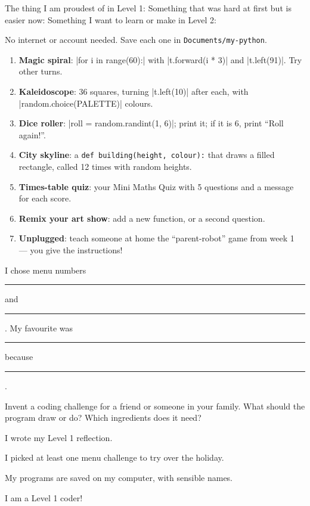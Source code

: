 \namedateline

\begin{core}
The thing I am proudest of in Level 1:
Something that was hard at first but is easier now:
Something I want to learn or make in Level 2:
\end{core}

\begin{challenge}
No internet or account needed. Save each one in \texttt{Documents/my-python}.
\begin{enumerate}[leftmargin=1.6em,itemsep=2pt]
  \item \textbf{Magic spiral}: \py|for i in range(60):| with \py|t.forward(i * 3)| and \py|t.left(91)|. Try other turns.
  \item \textbf{Kaleidoscope}: 36 squares, turning \py|t.left(10)| after each, with \py|random.choice(PALETTE)| colours.
  \item \textbf{Dice roller}: \py|roll = random.randint(1, 6)|; print it; if it is 6, print \enquote{Roll again!}.
  \item \textbf{City skyline}: a \texttt{def building(height, colour):} that draws a filled rectangle, called 12 times with random heights.
  \item \textbf{Times-table quiz}: your Mini Maths Quiz with 5 questions and a message for each score.
  \item \textbf{Remix your art show}: add a new function, or a second question.
  \item \textbf{Unplugged}: teach someone at home the \enquote{parent-robot} game from week 1 --- you give the instructions!
\end{enumerate}
I chose menu numbers \rule{1.2cm}{0.4pt} and \rule{1.2cm}{0.4pt}. My favourite was \rule{6cm}{0.4pt} because \rule{4cm}{0.4pt}.
\end{challenge}

\begin{creative}
Invent a coding challenge for a friend or someone in your family. What should the program draw or do? Which ingredients does it need?
\end{creative}

\begin{selfcheck}
  \item I wrote my Level 1 reflection.
  \item I picked at least one menu challenge to try over the holiday.
  \item My programs are saved on my computer, with sensible names.
  \item I am a Level 1 coder!
\end{selfcheck}
